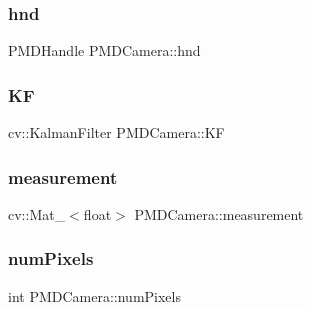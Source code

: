 \hypertarget{class_p_m_d_camera_a4422b04aee07aed56b58847d39b2230f}{}\label{class_p_m_d_camera_a4422b04aee07aed56b58847d39b2230f} 
\subsubsection{\texorpdfstring{hnd}{hnd}}
{\footnotesize\ttfamily P\+M\+D\+Handle P\+M\+D\+Camera\+::hnd\hspace{0.3cm}{\ttfamily [private]}}

\hypertarget{class_p_m_d_camera_ad0d43501bb89e4f24f37e0ba5fa78ae6}{}\label{class_p_m_d_camera_ad0d43501bb89e4f24f37e0ba5fa78ae6} 
\subsubsection{\texorpdfstring{KF}{KF}}
{\footnotesize\ttfamily cv\+::\+Kalman\+Filter P\+M\+D\+Camera\+::\+KF\hspace{0.3cm}{\ttfamily [private]}}

\hypertarget{class_p_m_d_camera_ab7536178e056881c11756892c5f0a4b0}{}\label{class_p_m_d_camera_ab7536178e056881c11756892c5f0a4b0} 
\subsubsection{\texorpdfstring{measurement}{measurement}}
{\footnotesize\ttfamily cv\+::\+Mat\+\_\+$<$float$>$ P\+M\+D\+Camera\+::measurement\hspace{0.3cm}{\ttfamily [private]}}

\hypertarget{class_p_m_d_camera_a0c9627cf393f3055f81c7259c62010f6}{}\label{class_p_m_d_camera_a0c9627cf393f3055f81c7259c62010f6} 
\subsubsection{\texorpdfstring{num\+Pixels}{numPixels}}
{\footnotesize\ttfamily int P\+M\+D\+Camera\+::num\+Pixels\hspace{0.3cm}{\ttfamily [private]}}

\hypertarget{class_p_m_d_camera_aef47cd1fda507e9921143f6d0302f5e0}{}\label{class_p_m_d_camera_aef47cd1fda507e9921143f6d0302f5e0} 
